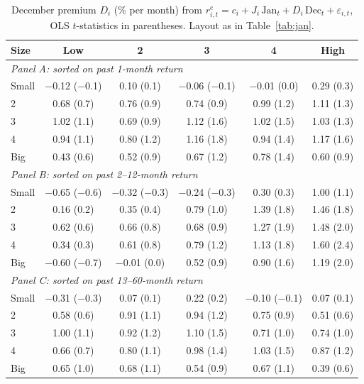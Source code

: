 \begin{table}[H]
\centering\small
\caption{December premium $D_i$ (\% per month) from $r^e_{i,t}=c_i+J_i\,\mathrm{Jan}_t+D_i\,\mathrm{Dec}_t+\varepsilon_{i,t}$, OLS $t$-statistics in parentheses. Layout as in Table~\ref{tab:jan}.}
\label{tab:dec}
\begin{tabular}{lccccc}
\toprule
Size & Low & 2 & 3 & 4 & High \\
\midrule
\multicolumn{6}{l}{\textit{Panel A: sorted on past 1-month return}} \\
Small & $-$0.12 ($-$0.1) & 0.10 (0.1) & $-$0.06 ($-$0.1) & $-$0.01 (0.0) & 0.29 (0.3) \\
2 & 0.68 (0.7) & 0.76 (0.9) & 0.74 (0.9) & 0.99 (1.2) & 1.11 (1.3) \\
3 & 1.02 (1.1) & 0.69 (0.9) & 1.12 (1.6) & 1.02 (1.5) & 1.03 (1.3) \\
4 & 0.94 (1.1) & 0.80 (1.2) & 1.16 (1.8) & 0.94 (1.4) & 1.17 (1.6) \\
Big & 0.43 (0.6) & 0.52 (0.9) & 0.67 (1.2) & 0.78 (1.4) & 0.60 (0.9) \\
\midrule
\multicolumn{6}{l}{\textit{Panel B: sorted on past 2--12-month return}} \\
Small & $-$0.65 ($-$0.6) & $-$0.32 ($-$0.3) & $-$0.24 ($-$0.3) & 0.30 (0.3) & 1.00 (1.1) \\
2 & 0.16 (0.2) & 0.35 (0.4) & 0.79 (1.0) & 1.39 (1.8) & 1.46 (1.8) \\
3 & 0.62 (0.6) & 0.66 (0.8) & 0.68 (0.9) & 1.27 (1.9) & 1.48 (2.0) \\
4 & 0.34 (0.3) & 0.61 (0.8) & 0.79 (1.2) & 1.13 (1.8) & 1.60 (2.4) \\
Big & $-$0.60 ($-$0.7) & $-$0.01 (0.0) & 0.52 (0.9) & 0.90 (1.6) & 1.19 (2.0) \\
\midrule
\multicolumn{6}{l}{\textit{Panel C: sorted on past 13--60-month return}} \\
Small & $-$0.31 ($-$0.3) & 0.07 (0.1) & 0.22 (0.2) & $-$0.10 ($-$0.1) & 0.07 (0.1) \\
2 & 0.58 (0.6) & 0.91 (1.1) & 0.94 (1.2) & 0.75 (0.9) & 0.51 (0.6) \\
3 & 1.00 (1.1) & 0.92 (1.2) & 1.10 (1.5) & 0.71 (1.0) & 0.74 (1.0) \\
4 & 0.66 (0.7) & 0.80 (1.1) & 0.98 (1.4) & 1.03 (1.5) & 0.87 (1.2) \\
Big & 0.65 (1.0) & 0.68 (1.1) & 0.54 (0.9) & 0.67 (1.1) & 0.39 (0.6) \\
\bottomrule
\end{tabular}
\end{table}

